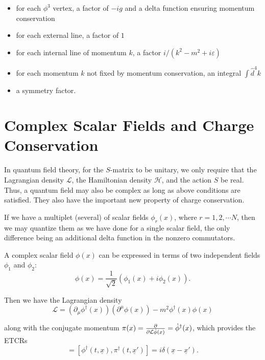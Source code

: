 \documentclass{article}
\numberwithin{equation}{section}
\begin{document}
\begin{itemize}
    \item for each $\phi^3$ vertex, a factor of $-ig$ and a delta function ensuring momentum conservation
    \item for each external line, a factor of $1$
    \item for each internal line of momentum $k$, a factor $i/(k^2-m^2+i\varepsilon)$
    \item for each momentum $k$ not fixed by momentum conservation, an integral $\int \hat{d}^4k$
    \item a symmetry factor.
\end{itemize}

\section{Complex Scalar Fields and Charge Conservation}

In quantum field theory, for the $S$-matrix to be unitary, we only require that the Lagrangian density $\mathcal{L}$, the Hamiltonian density $\mathcal{H}$, and the action $S$ be real. Thus, a quantum field may also be complex as long as above conditions are satisfied. They also have the important new property of charge conservation.

If we have a multiplet (several) of scalar fields $\phi_r(x)$, where $r=1,2,\cdots N$, then we may quantize them as we have done for a single scalar field, the only difference being an additional delta function in the nonzero commutators.

A complex scalar field $\phi(x)$ can be expressed in terms of two independent fields $\phi_1$ and $\phi_2$:
\begin{equation}
    \phi(x)=\frac{1}{\sqrt{2}}(\phi_1(x) + i\phi_2(x)).
\end{equation}

Then we have the Lagrangian density
\begin{equation}
    \mathcal{L} = \left(\partial_\mu\phi^\dagger(x)\right)\left(\partial^\mu\phi(x)\right)-m^2\phi^\dagger(x)\phi(x)
\end{equation}

along with the conjugate momentum $\pi(x)=\pdv{\mathcal{L}{\dot{\phi}(x)}}=\dot{\phi}^\dagger(x)$, which provides the ETCRs
\begin{equation}
    [\phi(t,\underline{x}), \pi(t,\underline{x}')]=[\phi^\dagger(t,\underline{x}),\pi^\dagger(t,\underline{x}')] = i\delta(\underline{x}-\underline{x}').
\end{equation}
\end{document}
